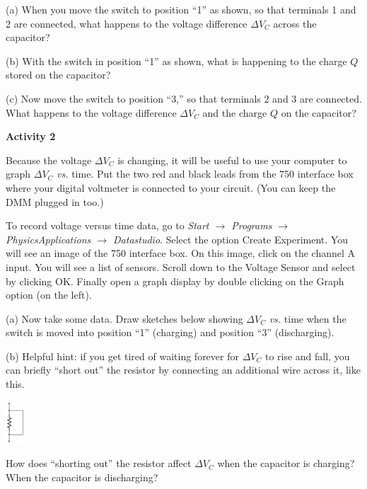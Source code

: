 (a) When you move the switch to position ``1'' as shown, so that terminals 1 and 2 are connected, what happens to the voltage difference $\Delta V_C$ across the capacitor?
\vspace{0.6in}

(b)  With the switch in position ``1'' as shown, what is happening to the charge $Q$ stored on the capacitor?
\vspace{0.6in}

(c)  Now move the switch to position ``3,'' so that terminals 2 and 3 are connected.  What happens to the voltage difference $\Delta V_C$ and the charge $Q$ on the capacitor?
\vspace{0.8in}

\pagebreak
\textbf{Activity 2}

Because the voltage $\Delta V_C$ is changing, it will be useful to use your computer to graph $\Delta V_C$ \textit{vs.} time.  Put the two red and black leads from the 750 interface box where your digital voltmeter is connected to your circuit.  (You can keep the DMM plugged in too.)

To record voltage versus time data, go to \textit{Start $\longrightarrow$ Programs $\longrightarrow$ PhysicsApplications $\longrightarrow$ Datastudio}. Select the option Create Experiment.  You will see an image of the 750 interface box.  On this image, click on the channel A input.  You will see a list of sensors.  Scroll down to the Voltage Sensor and select by clicking OK.  Finally open a graph display by double clicking on the Graph option (on the left).

(a)  Now take some data.  Draw sketches below showing $\Delta V_C$ \textit{vs.} time when the switch is moved into position ``1'' (charging) and position ``3'' (discharging).
\vspace{1.5in}

(b)  Helpful hint: if you get tired of waiting forever for $\Delta V_C$ to rise and fall, you can briefly “short out” the resistor by connecting an additional wire across it, like this.  
\begin{center}
\vspace{-0.2 in}
\includegraphics[width=0.05\textwidth]{rc_circuits/shorted_resistor_bw.eps}
\vspace{-0.2 in}
\end{center}
How does “shorting out” the resistor affect $\Delta V_C$ when the capacitor is charging?  When the capacitor is discharging?
\vspace{0.8in}


